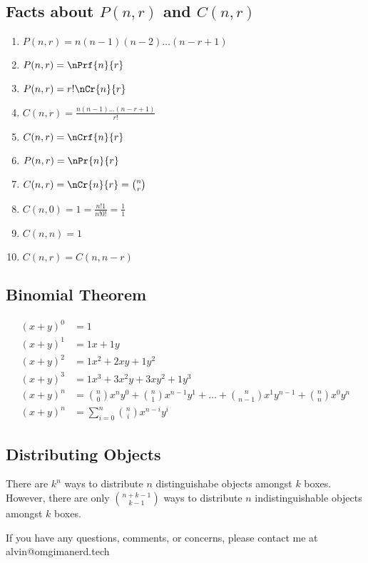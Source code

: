 \documentclass[letterpaper, 12pt]{math}
\begin{document}
\subsection*{Facts about \( P(n,r) \) and \( C(n,r) \)}
\begin{enumerate}
  \item \( P(n,r) = n(n-1)(n-2)\dots(n-r+1) \)
  \item \( P(n,r) = \nPrf{n}{r} \)
  \item \( P(n,r) = r!\nCr{n}{r} \)
  \item \( C(n,r) = \frac{n(n-1)\dots(n-r+1)}{r!} \)
  \item \( C(n,r) = \nCrf{n}{r} \)
  \item \( P(n,r) = {\nPr{n}{r}} \)
  \item \( C(n,r) = {\nCr{n}{r}} = \binom{n}{r} \)
  \item \( C(n,0) = 1 = \frac{n!1}{n!0!} = \frac{1}{1} \)
  \item \( C(n,n) = 1 \)
  \item \( C(n,r) = C(n,n-r) \)
\end{enumerate}

\subsection*{Binomial Theorem}
\begin{align*}
  (x+y)^{0} &= 1 \\
  (x+y)^{1} &= 1x+1y \\
  (x+y)^{2} &= 1x^{2}+2xy+1y^{2} \\
  (x+y)^{3} &= 1x^{3}+3x^{2}y+3xy^{2}+1y^{3} \\
  (x+y)^{n} &= \binom{n}{0}x^{n}y^{0}+\binom{n}{1}x^{n-1}y^{1}+\dots+
      \binom{n}{n-1}x^{1}y^{n-1}+\binom{n}{n}x^{0}y^{n} \\
  (x+y)^{n} &= \sum_{i=0}^{n}\binom{n}{i}x^{n-i}y^{i}
\end{align*}

\subsection*{Distributing Objects}
There are \( k^{n} \) ways to distribute \( n \) distinguishabe objects amongst
\( k \) boxes. However, there are only \( \binom{n+k-1}{k-1} \) ways to
distribute \( n \) indistinguishable objects amongst \( k \) boxes.

\begin{center}
  If you have any questions, comments, or concerns, please contact me at
  alvin@omgimanerd.tech
\end{center}
\end{document}
